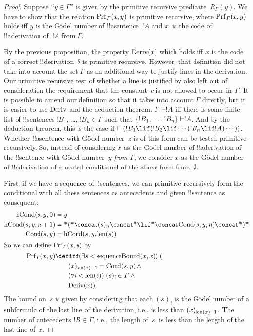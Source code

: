 \documentclass[../../../include/open-logic-section]{subfiles}
\begin{document}
\begin{proof}
Suppose ``$y \in \Gamma$'' is given by the primitive recursive
predicate~$R_\Gamma(y)$.  We have to show that the relation
$\Prf[\Gamma](x, y)$ is primitive recursive, where $\Prf[\Gamma](x,
y)$ holds iff $y$ is the G\"odel number of !!a{sentence}~$!A$ and
$x$~is the code of !!a{derivation} of~$!A$ from $\Gamma$.

By the previous proposition, the property $\mathrm{Deriv}(x)$ which holds
iff $x$ is the code of a correct !!{derivation}~$\delta$ is primitive
recursive. However, that definition did not take into account the set
$\Gamma$ as an additional way to justify lines in the derivation. Our
primitive recursive test of whether a line is justified by \QR{} also
left out of consideration the requirement that the constant~$c$ is not
allowed to occur in~$\Gamma$. It is possible to amend our definition so
that it takes into account $\Gamma$ directly, but it is easier to use
$\mathrm{Deriv}$ and the deduction theorem. $\Gamma \Proves !A$ iff
there is some finite list of !!{sentence}s $!B_1$, \dots, $!B_n \in
\Gamma$ such that $\{!B_1, \dots, !B_n\} \Proves !A$. And by the
deduction theorem, this is the case if $\Proves (!B_1 \lif (!B_2 \lif
\cdots (!B_n \lif !A)\cdots))$. Whether !!a{sentence} with G\"odel
number~$z$ is of this form can be tested primitive recursively.  So,
instead of considering $x$ as the G\"odel number of !!a{derivation} of
the !!{sentence} with G\"odel number~$y$ \emph{from $\Gamma$}, we consider
$x$ as the G\"odel number of !!a{derivation} of a nested conditional
of the above form from~$\emptyset$.

First, if we have a sequence of !!{sentence}s, we can primitive
recursively form the conditional with all these sentences as
antecedents and given !!{sentence} as consequent:
\begin{align*}
  \fn{hCond}(s, y, 0) & = y \\
  \fn{hCond}(s, y, n+1) & = \Gn{(} \concat (s)_{n} \concat \Gn{\lif}
  \concat \fn{Cond}(s, y, n) \concat \Gn{)}\\
  \fn{Cond}(s, y) & = \fn{hCond}(s, y, \len{s})\\
  \intertext{So we can define $\Prf[\Gamma](x, y)$ by}
  \Prf[\Gamma](x, y) & \defiff \bexists{s < \fn{sequenceBound}(x,x)}{(} \\
  &\qquad (x)_{\len{x}-1} = \fn{Cond}(s,y) \land {} \\
  &\qquad\bforall{i<\len{s}}{(s)_i \in \Gamma} \land {} \\
  &\qquad\fn{Deriv}(x)).
\end{align*}
The bound on~$s$ is given by considering that each $(s)_i$ is the
G\"odel number of a subformula of the last line of the derivation,
i.e., is less than $(x)_{\mathrm{len}(x)-1}$. The number of antecedents $!B
\in \Gamma$, i.e., the length of~$s$, is less than the length of the
last line of~$x$.
\end{proof}
\end{document}
